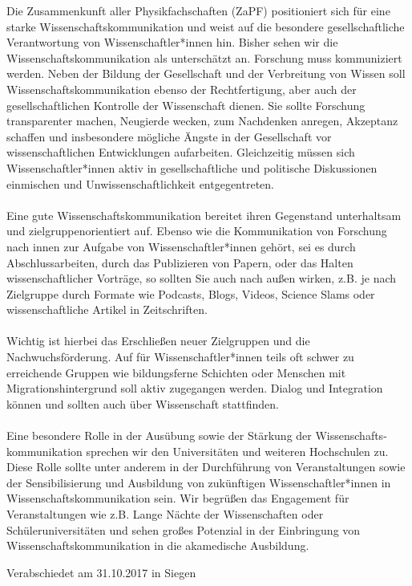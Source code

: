 \documentclass[DIV=calc]{scrartcl}
\begin{document}
Die Zusammenkunft aller Physikfachschaften (ZaPF) positioniert sich für eine starke Wissen\-schafts\-kommunikation und weist auf die besondere gesellschaftliche Verantwortung von Wissenschaftler*innen hin. Bisher sehen wir die Wissen\-schafts\-kommunikation als unterschätzt an. Forschung muss kommuniziert werden. Neben der Bildung der Gesellschaft und der Verbreitung von Wissen soll Wissen\-schafts\-kommunikation ebenso der Rechtfertigung, aber auch der gesellschaftlichen Kontrolle der Wissenschaft dienen. Sie sollte Forschung transparenter machen, Neugierde wecken, zum Nachdenken anregen, Akzeptanz schaffen und insbesondere mögliche Ängste in der Gesellschaft vor wissenschaftlichen Entwicklungen aufarbeiten. Gleichzeitig müssen sich Wissenschaftler*innen aktiv in gesellschaftliche und politische Diskussionen einmischen und Unwissenschaftlichkeit entgegentreten.
\\\\Eine gute Wissenschaftskommunikation bereitet ihren Gegenstand unterhaltsam und zielgruppenorientiert auf. Ebenso wie die Kommunikation von Forschung nach innen zur Aufgabe von Wissenschaftler*innen gehört, sei es durch Abschlussarbeiten, durch das Publizieren von Papern, oder das Halten  wis\-sen\-schaft\-licher Vorträge, so sollten Sie auch nach außen wirken, z.B. je nach Zielgruppe durch Formate wie Podcasts, Blogs, Videos, Science Slams oder wissenschaftliche Artikel in Zeitschriften.
\\\\Wichtig ist hierbei das Erschließen neuer Zielgruppen und die Nach\-wuchs\-för\-der\-ung. Auf für Wissenschaftler*innen teils oft schwer zu erreichende Gruppen wie bildungsferne Schichten oder Menschen mit Migrationshintergrund soll aktiv zugegangen werden. Dialog und Integration können und sollten auch über Wissenschaft stattfinden.
\\\\Eine besondere Rolle in der Ausübung sowie der Stärkung der Wissen\-schafts-\\\-kommunikation sprechen wir den Universitäten und weiteren Hochschulen zu. Diese Rolle sollte unter anderem in der Durch\-führ\-ung von Veranstaltungen sowie der Sensibilisierung und Ausbildung von zukünftigen Wissenschaftler*innen in Wissenschaftskommunikation sein.
Wir begrüßen das Engagement für Veranstaltungen wie z.B. Lange Nächte der Wissenschaften oder Schüleruniversitäten und sehen großes Potenzial in der Einbringung von Wissenschaftskommunikation in die akamedische Ausbildung.
\vspace{-0.5\baselineskip}
    \begin{flushright}
        Verabschiedet am 31.10.2017 in Siegen
    \end{flushright}
\end{document}
